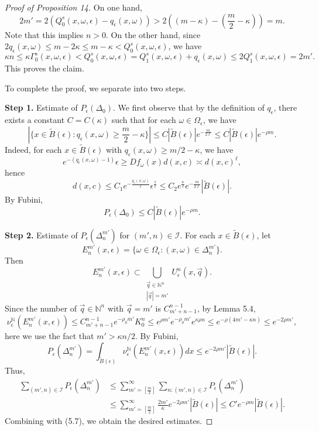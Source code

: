 \documentclass[11pt,oneside]{article}
\theoremstyle{plain}
\numberwithin{equation}{section}
\numberwithin{figure}{section}
\numberwithin{table}{section}
\begin{document}
\begin{proof}[Proof of Proposition 14]
On one hand, 
\[
2m' = 2(Q_0^s(x, \omega, \epsilon) - q_{\epsilon}(x, \omega)) > 2((m-\kappa) - (\frac{m}{2} - \kappa)) =m.
\]
Note that this implies $n > 0$. On the other hand, since $2 q_{\epsilon}(x, \omega) \leq m - 2 \kappa \leq m - \kappa < Q_0^s(x, \omega, \epsilon)$, we have 
\[
\kappa n \leq \kappa \Gamma_0^{s}(x, \omega, \epsilon)  <Q_0^{s}(x, \omega, \epsilon)  =Q_1^{s}(x, \omega, \epsilon) + q_{\epsilon}(x, \omega) \leq 2 Q_1^{s}(x, \omega, \epsilon) = 2 m'.
\]
This proves the claim.


To complete the proof, we separate into two steps.


\noindent
{\bf Step 1.} Estimate of $P_{\epsilon} (\Delta_0)$. We first observe that by the definition of $q_{\epsilon}$, there exists a constant $C = C(\kappa)$ such that for each $\omega \in \Omega_{\epsilon}$, we have
\[
|\{ x \in \tilde B(\epsilon) : q_{\epsilon} (x, \omega) \geq \frac{m}{2} - \kappa \} | \leq C | \tilde B(\epsilon)| e^{-\frac{m}{2 \ell}} \leq C | \tilde B(\epsilon)| e^{-\rho m}.
\]
Indeed, for each $x \in \tilde B(\epsilon)$ with $q_{\epsilon} (x, \omega) \geq m/2 - \kappa$, we have
\[
e^{-(q_{\epsilon}(x, \omega) -1)}\epsilon \geq Df_{\omega}(x) d (x, c) \asymp d(x, c)^{\ell},  
\]
hence
\[
d(x, c)\leq C_1 e^{- \frac{q_{\epsilon}(x, \omega)}{\ell}} \epsilon^{\frac{1}{\ell}} \leq C_2 e^{\frac{\kappa}{\ell}}e^{- \frac{m}{2\ell}} |\tilde B(\epsilon)|.
\]
By Fubini,
\[
P_{\epsilon} (\Delta_0) \leq C | \tilde B(\epsilon)| e^{-\rho m}.
\]


\noindent
{\bf Step 2.} Estimate of $P_{\epsilon} (\Delta_n^{m'})$ for $(m', n) \in \mathcal I$. For each $x \in \tilde B(\epsilon)$, let 
\[
E_n^{m'}(x, \epsilon)  = \{\omega \in \Omega_{\epsilon} : (x ,\omega) \in \Delta_n^{m'} \}.
\]
Then 
\[
E_n^{m'}(x, \epsilon) \subset \bigcup_{\substack{\vec q \in \mathbb N^n\\ |\vec q| = m'} } U_{\epsilon}^n (x, \vec q).
\]
Since the number of $\vec q \in \mathbb N^n$ with $\vec q = m'$ is $C_{m'+n-1}^{n-1}$, by Lemma 5.4, 
\[
\nu_{\epsilon}^{\mathbb N} (E_n^{m'}(x, \epsilon)) \leq C_{m'+n-1}^{n-1} e^{-\rho_0 m'} K_0^n \leq e^{\rho m'} e^{-\rho_0 m'} e^{\kappa \rho n} \leq e^{- \rho(4m' - \kappa n)} \leq e^{-2 \rho m'},
\]
here we use the fact that $m' > \kappa n /2$. By Fubini,
\[
P_{\epsilon} (\Delta_n^{m'}) = \int_{\tilde B(\epsilon)} \nu_{\epsilon}^{\mathbb N} (E_n^{m'}(x, \epsilon))dx \leq e^{-2\rho m'} |\tilde B(\epsilon)|.
\]
Thus,
\begin{align*}
\sum_{(m', n) \in \mathcal I} P_{\epsilon} (\Delta_n^{m'})  & \leq \sum_{m' = [\frac{m}{2}]}^{\infty} \sum_{n: (m', n) \in \mathcal I} P_{\epsilon} (\Delta_n^{m'})  \\
&\leq \sum_{m' = [\frac{m}{2}]}^{\infty}  \frac{2m'}{\kappa} e^{-2\rho m'} |\tilde B(\epsilon)| \leq C' e^{-\rho m} |\tilde B(\epsilon)|.
\end{align*}
Combining with (5.7), we obtain the desired estimates.


\end{proof}
\end{document}
